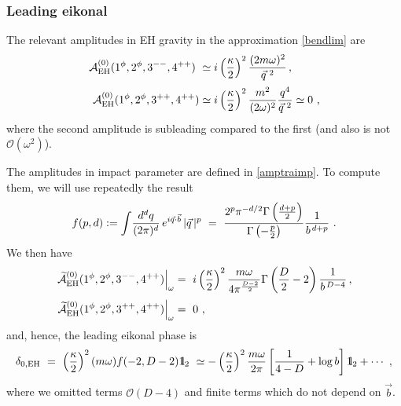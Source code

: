 \documentclass[a4paper,11pt]{article}
\numberwithin{equation}{section}
\newcommand{\cO}{\mathcal{O}}
\def\uno{\mbox{1 \kern-.59em {\rm l}}}
\begin{document}
\subsubsection{Leading eikonal}

The relevant amplitudes in EH gravity in the approximation \eqref{bendlim} are
\begin{equation}
    \label{eq:ssggtree}
    \begin{split}
        \mathcal{A}_{\rm EH}^{(0)} (1^\phi, 2^\phi, 3^{--}, 4^{++}) \ & 
        \simeq i \left({\kappa\over 2}\right)^2 {( 2 m \omega)^2 \over \vec{q}^{\, \, 2}} \, , \\[.2em]
        \mathcal{A}_{\rm EH}^{(0)} (1^\phi, 2^\phi, 3^{++}, 4^{++}) & 
        \simeq i \left({\kappa\over 2}\right)^2 {m^2 \over ( 2 \omega)^2} { q^4 \over \vec{q}^{\, \, 2}} \simeq 0 \ , 
    \end{split}
\end{equation} 
where the second amplitude is subleading compared to the first (and also is not  $\mathcal{O}(\omega^2)$). 


The  amplitudes in impact parameter are defined in \eqref{amptraimp}. To compute them, we will use repeatedly the result
\begin{align}
f(p, d):= \int\!{d^dq\over (2 \pi)^d} \, e^{i\vec{q} \cdot \vec{b}}  \, |\vec{q}\, |^{p}\ = \ 
{2^p \pi^{-d/2} 
\Gamma\left( 
{{d+p}\over 2}\right)\over 
\Gamma \left( - {p\over 2} \right)
} 
{1\over b^{\, d+p}} 
\ . 
\end{align}
We then have 
\begin{equation}
    \begin{split}
        \left.\widetilde{\mathcal{A} }_{\rm EH}^{(0)} (1^\phi, 2^\phi, 3^{--}, 4^{++})\right|_{\omega}  & 
        = \ i  \left({\kappa\over 2}\right)^2 {m \omega \over 4 \pi^{{D-2}\over 2}} \Gamma\left( {D\over 2} - 2 \right) {1\over b^{\, D-4}}\, , \\[.2em]
        \left.\widetilde{\mathcal{A} }_{\rm EH}^{(0)} (1^\phi, 2^\phi, 3^{++}, 4^{++})\right|_{\omega}  & = \ 0 \ , 
    \end{split}
\end{equation} 
and, hence, the leading eikonal phase is
\begin{equation}
    \begin{split}
\label{leadingtreeEH}
\mathcal{\delta}_{0, {\rm EH}} \ = \  \left({\kappa\over 2}\right)^2 ( m \omega) f (-2, D-2) \mathbf{\uno}_2
\ \simeq - \left({\kappa\over 2}\right)^2 \frac{m \omega}{2 \pi} \left[\frac{1}{4-D} + \log{b} \right]\mathbf{\uno}_2 + \cdots \ ,
\end{split}
\end{equation}
where we omitted terms $\cO(D-4)$ and finite terms which do not depend on $\vec{b}$.
\end{document}
